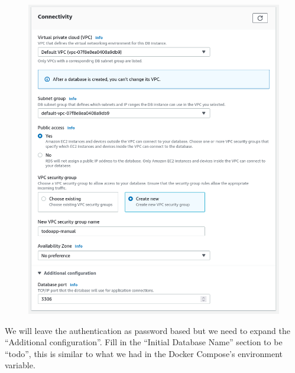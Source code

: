 \documentclass{csse4400}
\begin{document}
\begin{figure}[H]
  \includegraphics[width=\textwidth]{images/db6}
\end{figure}

We will leave the authentication as password based but we need to expand the ``Additional configuration''. Fill in the ``Initial Database Name'' section to be ``todo'', this is similar to what we had in the Docker Compose's environment variable.

\end{document}
